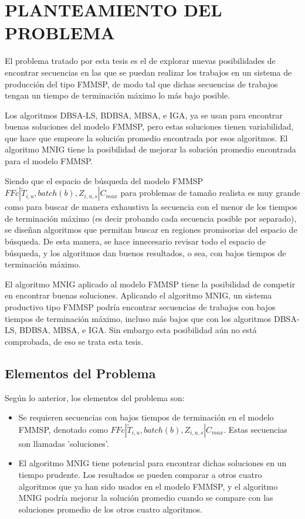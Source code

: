 \documentclass{article}
\def\notac_modelo{$FFc | \tilde{T}_{i, u}, batch(b), Z_{i, u, s} | C_{max}$}
\begin{document}
\section{PLANTEAMIENTO DEL PROBLEMA}

El problema tratado por esta tesis es el de explorar nuevas posibilidades de encontrar secuencias en las que se puedan realizar los trabajos en un sistema de producción del tipo FMMSP, de modo tal que dichas secuencias de trabajos tengan un tiempo de terminación máximo lo más bajo posible.

Los algoritmos DBSA-LS, BDBSA, MBSA, e IGA, ya se usan para encontrar buenas soluciones del modelo FMMSP, pero estas soluciones tienen variabilidad, que hace que empeore la solución promedio encontrada por esos algoritmos. El algoritmo MNIG tiene la posibilidad de mejorar la solución promedio encontrada para el modelo FMMSP.

\vspace{\baselineskip}
Siendo que el espacio de búsqueda del modelo FMMSP \linebreak \notac_modelo para problemas de tamaño realista es muy grande como para buscar de manera exhaustiva la secuencia con el menor de los tiempos de terminación máximo (es decir probando cada secuencia posible por separado), se diseñan algoritmos que permitan buscar en regiones promisorias del espacio de búsqueda. De esta manera, se hace innecesario revisar todo el espacio de búsqueda, y los algoritmos dan buenos resultados, o sea, con bajos tiempos de terminación máximo.

\vspace{\baselineskip}
El algoritmo MNIG aplicado al modelo FMMSP tiene la posibilidad de competir en encontrar buenas soluciones. Aplicando el algoritmo MNIG, un sistema productivo tipo FMMSP podría encontrar secuencias de trabajos con bajos tiempos de terminación máximo, incluso más bajos que con los algoritmos DBSA-LS, BDBSA, MBSA, e IGA. Sin embargo esta posibilidad aún no está comprobada, de eso se trata esta tesis.

\subsection{Elementos del Problema}

Según lo anterior, los elementos del problema son:

\vspace{\baselineskip}
\begin{itemize}
    \item[\maltese] Se requieren secuencias con bajos tiempos de terminación en el modelo FMMSP, denotado como \notac_modelo. Estas secuencias son llamadas 'soluciones'.
    \item[\maltese] El algoritmo MNIG tiene potencial para encontrar dichas soluciones en un tiempo prudente. Los resultados se pueden comparar a otros cuatro algoritmos que ya han sido usados en el modelo FMMSP, y el algoritmo MNIG podría mejorar la solución promedio cuando se compare con las soluciones promedio de los otros cuatro algoritmos.
\end{itemize}
\end{document}
